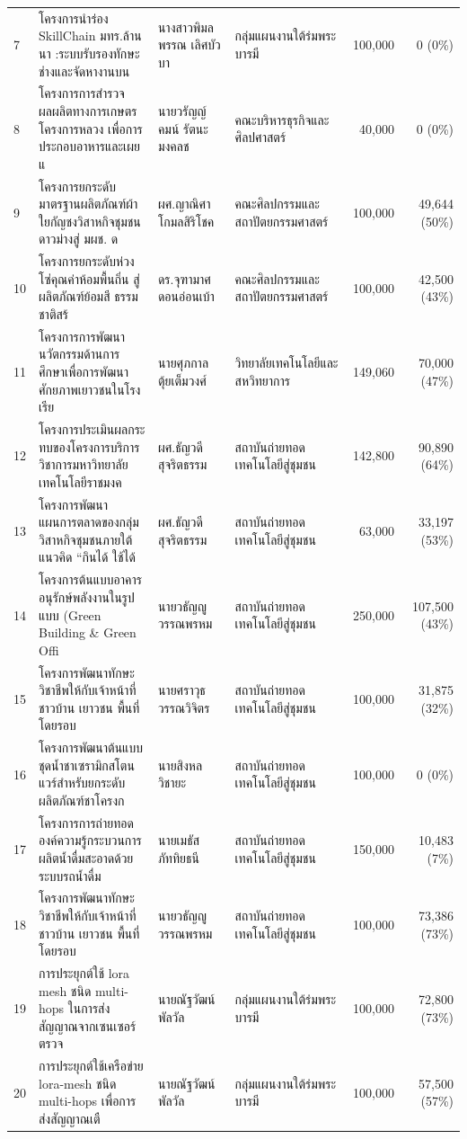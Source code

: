 {\begin{longtable}{@{}p{0.5cm}p{6.1cm}p{2.9cm}p{2.7cm}rr@{}}
7 & โครงการนำร่อง SkillChain มทร.ล้านนา :ระบบรับรองทักษะช่างและจัดหางานบน & นางสาวพิมลพรรณ เลิศบัวบา & กลุ่มแผนงานใต้ร่มพระบารมี & 100,000 & 0 (0\%)\\
8 & โครงการการสำรวจผลผลิตทางการเกษตรโครงการหลวง เพื่อการประกอบอาหารและเผยแ & นายวรัญญ์คมน์ รัตนะมงคลช & คณะบริหารธุรกิจและศิลปศาสตร์ & 40,000 & 0 (0\%)\\
9 & โครงการยกระดับมาตรฐานผลิตภัณฑ์ผ้าใยกัญชงวิสาหกิจชุมชนดาวม่างสู่ มผช. ด & ผศ.ญาณิศา โกมลสิริโชค & คณะศิลปกรรมและสถาปัตยกรรมศาสตร์ & 100,000 & 49,644 (50\%)\\
10 & โครงการยกระดับห่วงโซ่คุณค่าห้อมพื้นถิ่น สู่ผลิตภัณฑ์ย้อมสี ธรรมชาติสร้ & ดร.จุฑามาศ ดอนอ่อนเบ้า & คณะศิลปกรรมและสถาปัตยกรรมศาสตร์ & 100,000 & 42,500 (43\%)\\
11 & โครงการการพัฒนานวัตกรรมด้านการศึกษาเพื่อการพัฒนาศักยภาพเยาวชนในโรงเรีย & นายศุภกาล ตุ้ยเต็มวงศ์ & วิทยาลัยเทคโนโลยีและสหวิทยาการ & 149,060 & 70,000 (47\%)\\
12 & โครงการประเมินผลกระทบของโครงการบริการวิชาการมหาวิทยาลัยเทคโนโลยีราชมงค & ผศ.ธัญวดี สุจริตธรรม & สถาบันถ่ายทอดเทคโนโลยีสู่ชุมชน & 142,800 & 90,890 (64\%)\\
13 & โครงการพัฒนาแผนการตลาดของกลุ่มวิสาหกิจชุมชนภายใต้แนวคิด “กินได้ ใช้ได้ & ผศ.ธัญวดี สุจริตธรรม & สถาบันถ่ายทอดเทคโนโลยีสู่ชุมชน & 63,000 & 33,197 (53\%)\\
14 & โครงการต้นแบบอาคารอนุรักษ์พลังงานในรูปแบบ (Green Building \& Green Offi & นายวธัญญู วรรณพรหม & สถาบันถ่ายทอดเทคโนโลยีสู่ชุมชน & 250,000 & 107,500 (43\%)\\
15 & โครงการพัฒนาทักษะวิชาชีพให้กับเจ้าหน้าที่ ชาวบ้าน เยาวชน พื้นที่โดยรอบ & นายศราวุธ วรรณวิจิตร & สถาบันถ่ายทอดเทคโนโลยีสู่ชุมชน & 100,000 & 31,875 (32\%)\\
16 & โครงการพัฒนาต้นแบบชุดน้ำชาเซรามิกสโตนแวร์สำหรับยกระดับผลิตภัณฑ์ชาโครงก & นายสิงหล วิชายะ & สถาบันถ่ายทอดเทคโนโลยีสู่ชุมชน & 100,000 & 0 (0\%)\\
17 & โครงการการถ่ายทอดองค์ความรู้กระบวนการผลิตน้ำดื่มสะอาดด้วยระบบรถน้ำดื่ม & นายเมธัส ภัททิยธนี & สถาบันถ่ายทอดเทคโนโลยีสู่ชุมชน & 150,000 & 10,483 (7\%)\\
18 & โครงการพัฒนาทักษะวิชาชีพให้กับเจ้าหน้าที่ ชาวบ้าน เยาวชน พื้นที่โดยรอบ & นายวธัญญู วรรณพรหม & สถาบันถ่ายทอดเทคโนโลยีสู่ชุมชน & 100,000 & 73,386 (73\%)\\
19 & การประยุกต์ใช้ lora mesh ชนิด multi-hops ในการส่งสัญญาณจากเซนเซอร์ตรวจ & นายณัฐวัฒน์ พัลวัล & กลุ่มแผนงานใต้ร่มพระบารมี & 100,000 & 72,800 (73\%)\\
20 & การประยุกต์ใช้เครือข่าย lora-mesh ชนิด multi-hops เพื่อการส่งสัญญาณเตื & นายณัฐวัฒน์ พัลวัล & กลุ่มแผนงานใต้ร่มพระบารมี & 100,000 & 57,500 (57\%)\\

\end{longtable}}
